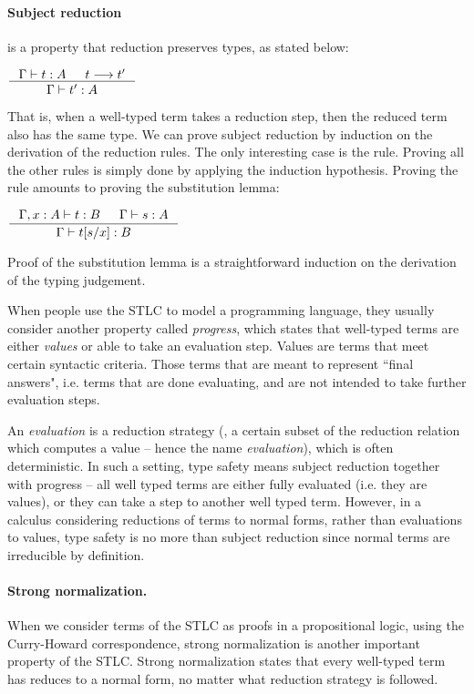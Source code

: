 \paragraph{Subject reduction} is a property that reduction preserves types,
as stated below:
\begin{theorem}
	$\inference{\Gamma |- t : A  & t --> t'}{\Gamma |- t' : A}$
\end{theorem}
That is, when a well-typed term takes a reduction step, then the reduced term
also has the same type. We can prove subject reduction
by induction on the derivation of the reduction rules.
The only interesting case is the  rule. Proving all
the other rules is simply done by applying the induction hypothesis.
Proving the  rule amounts to proving the substitution lemma:
\begin{lemma}[substitution]
$ \inference{\Gamma,x:A |- t : B  & \Gamma |- s : A}{\Gamma |- t[s/x] : B} $
\end{lemma}
Proof of the substitution lemma is a straightforward induction on
the derivation of the typing judgement.

When people use the STLC to model a programming language,
they usually consider another property called \emph{progress},
which states that well-typed terms are either {\em values} or
able to take an evaluation step. 
Values are terms that meet certain syntactic criteria. Those terms
that are meant to represent ``final answers", i.e. terms that
are done evaluating, and are not intended
to take further evaluation steps. 

An {\em evaluation} is a reduction strategy
(\ie, a certain subset of the reduction relation which computes a value --
hence the name {\em evaluation}), which is often deterministic.
In such a setting, type safety means subject reduction together with progress --
all well typed terms are either fully evaluated (i.e. they are values), or they
can take a step to another well typed term.  However, in a calculus considering
reductions of terms to normal forms, rather than evaluations to values,
type safety is no more than subject reduction since normal terms are
irreducible by definition.

\paragraph{Strong normalization.} 
When we consider terms of the STLC as proofs in a propositional logic,
using the Curry-Howard correspondence, strong normalization
is another important property of the STLC. Strong normalization states
that every well-typed term has reduces to a normal form, no matter what
reduction strategy is followed.

